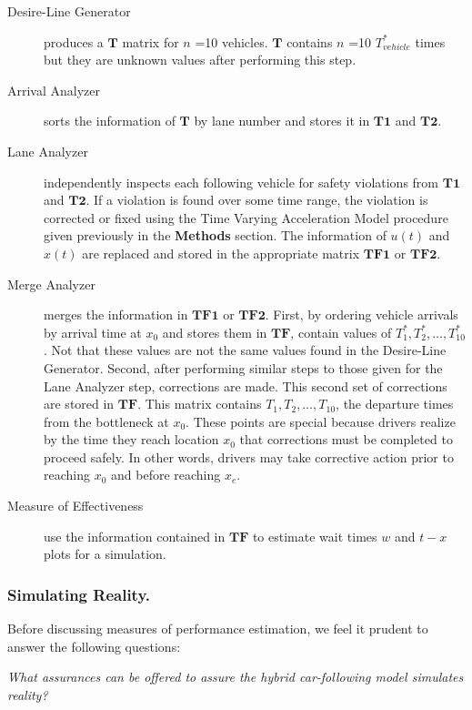 \documentclass[Proceedings]{ascelike}
\begin{document}
\begin{description}
\item [ Desire-Line Generator] produces a $\mathbf{T}$ matrix for $n$ =10 vehicles. $\mathbf{T}$ contains $n$ =10  $T_{vehicle}^*$ times but they are unknown values after performing this step.
\item [ Arrival Analyzer] sorts the information of $\mathbf{T}$ by lane number and stores it in $\mathbf{T1}$ and  $\mathbf{T2}$.
\item [ Lane Analyzer] independently inspects each following vehicle for safety violations from $\mathbf{T1}$ and  $\mathbf{T2}$. If a violation is found over some time range, the violation is corrected or fixed using the Time Varying Acceleration Model procedure given previously in the \textbf{Methods} section.  The information of $u(t)$ and $x(t)$  are replaced and stored in   the appropriate matrix $\mathbf{TF1}$ or  $\mathbf{TF2}$.
\item [ Merge Analyzer] merges the information in $\mathbf{TF1}$ or  $\mathbf{TF2}$. First, by ordering vehicle arrivals by arrival time at $x_0$ and stores them in $\mathbf{TF}$, contain values of  $T^*_1, T^*_2,\ldots,T^*_{10}$. Not that these values are  not the same values found in the Desire-Line Generator. Second, after performing similar steps to those given for the  Lane Analyzer step, corrections are made. This second set of corrections are stored in $\mathbf{TF}$. This matrix contains $T_1, T_2,\ldots,T_{10}$, the departure times from the bottleneck at $x_0$. These points are special because drivers realize by the time they reach location $x_0$ that corrections must be completed to proceed safely. In other words, drivers may take corrective action prior to reaching $x_0$ and before reaching $x_e$. 

\item [ Measure of Effectiveness] use the information contained in $\mathbf{TF}$ to estimate wait times $w$ and $t-x$ plots for a simulation.
\end{description}

\subsubsection{Simulating Reality.} 

Before discussing  measures of performance estimation, we feel it prudent to answer the following questions: 

\noindent \emph{What assurances can be offered to assure the hybrid car-following model simulates reality? }
\end{document}
